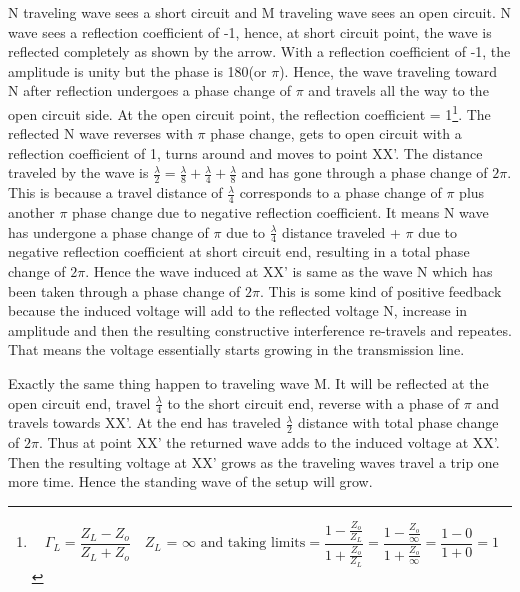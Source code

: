  N traveling wave sees a short circuit and M traveling wave sees an open circuit. N wave sees a reflection coefficient of -1, hence, at short circuit point, the wave is reflected completely as shown by the arrow. With a reflection coefficient of -1, the amplitude is unity but the phase is 180\textdegree (or $\pi$). Hence, the wave traveling toward N after reflection undergoes a phase change of $\pi$ and travels all the way to the open circuit side. At the open circuit point, the reflection coefficient = 1\footnote{
\begin{dmath*}
\Gamma_{L} = \frac{Z_{L} - Z_{o}}{Z_{L} + Z_{o}}\quad Z_{L}\text{ = }\infty\text{ and taking limits}
= \frac{1 - \frac{Z_{o}}{Z_{L}}}{1 + \frac{Z_{o}}{Z_{L}}}
= \frac{1 - \frac{Z_{o}}\infty}{1 + \frac{Z_{o}}\infty}
= \frac{1 - 0}{1 + 0}
= 1
\end{dmath*}
}. The reflected N wave reverses with $\pi$ phase change, gets to open circuit with a reflection coefficient of 1, turns around and moves to point XX'. The distance traveled by the wave is $ \frac{\lambda}{2} = \frac{\lambda}{8} + \frac{\lambda}{4} + \frac{\lambda}{8}$ and has gone through a phase change of $2\pi$. This is because a travel distance of $\frac{\lambda}{4}$ corresponds to a phase change of $\pi$ plus another $\pi$ phase change due to negative reflection coefficient. It means N wave has undergone a phase change of $\pi$ due to $\frac{\lambda }{4}$ distance traveled + $\pi$ due to negative reflection coefficient at short circuit end, resulting in a total phase change of $2\pi$. Hence the wave induced at XX' is same as the wave N which has been taken through a phase change of $2\pi$. This is some kind of positive feedback because the induced voltage will add to the reflected voltage N, increase in amplitude and then the resulting constructive interference re-travels and repeates. That means the voltage essentially starts growing in the transmission line.

Exactly the same thing happen to traveling wave M. It will be reflected at the open circuit end, travel $\frac{\lambda}{4}$ to the short circuit end, reverse with a phase of $\pi$ and travels towards XX'. At the end has traveled $\frac{\lambda }{2}$ distance with total phase change of $2\pi$. Thus at point XX' the returned wave adds to the induced voltage at XX'. Then the resulting voltage at XX' grows as the traveling waves travel a trip one more time. Hence the standing wave of the setup will grow.

